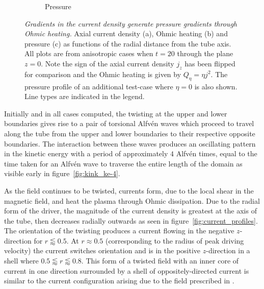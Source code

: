 \documentclass[fleqn,usenatbib]{mnras}
\newcommand{\rs}[2]{{#2}}
\newcommand{\mycaption}[2]{\caption[#1]{\emph{#1} #2}}
\begin{document}
\begin{figure}
\begin{subfigure}{0.32\textwidth}
      \caption{Pressure}
      \label{fig:pressure_profiles}
    \end{subfigure}
  \mycaption{Gradients in the current density generate pressure
    gradients through Ohmic heating.}{\rs{}{Axial current density (a), Ohmic heating
      (b) and pressure (c) as functions of the radial distance from
      the tube axis.}{} All plots are from \rs{switching}{anisotropic}
    cases when $t=20$ through the plane $z=0$. Note the sign of the
    axial current density $j_z$ has been flipped for comparison and
    the Ohmic heating is given by $Q_{\eta} = \eta j^2$. The pressure
    profile of an additional test-case where $\eta=0$ is also
    shown. \rs{}{Line types are indicated in the legend.}}%
  \label{fig:pressure_and_heating}
\end{figure}

\rs{In all cases, the initial reaction to the twisting at the upper
and lower boundaries is two}{Initially and in all cases computed, the
twisting at the upper and lower boundaries gives rise to a pair of}
torsional Alfv\'en waves which \rs{}{proceed to} travel along the tube
from the upper and lower boundaries to \rs{the}{their respective}
opposite boundaries. The interaction between these waves produces an 
oscillating pattern in the kinetic energy with a period of
approximately $4$ Alfv\'en times, equal to the time taken for an
Alfv\'en wave to \rs{travel}{traverse} the entire length of the domain
\rs{}{as} visible early in figure~\ref{fig:kink_ke-4}. 

As the field continues to be twisted, currents form, due to the local
shear in the magnetic field, \rs{which}{and} heat the plasma through Ohmic
\rs{heating}{dissipation}. Due to the radial form of the driver, the magnitude of the
current density is greatest at the axis of the tube, then decreases
radially outwards \rs{}{as seen in} figure~\ref{fig:current_profiles}. The orientation
of the twisting produces a current \rs{directed}{flowing} in the negative
$z$-direction for $r\lessapprox0.5$. At $r \approx 0.5$ (corresponding
to the radius of peak driving velocity) the current switches \rs{direction}{orientation}
and is in the positive $z$-direction in a shell where $0.5\lessapprox
r \lessapprox 0.8$. This form of \rs{}{a} twisted field with an inner core of
current in one direction surrounded by \rs{an}{a shell of}
oppositely-directed current is similar to the \rs{prescribed field in
chapter~}{current configuration arising due to the field prescribed in} \citep{quinnEffectAnisotropicViscosity2020}. 
\end{document}
